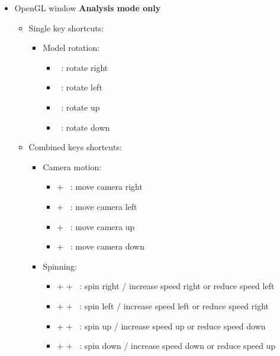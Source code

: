 {\begin{itemize}
\begin{itemize}
\begin{itemize}
\begin{itemize}
\item[] \Ctrl +  : enter / exit fullscreen mode 
\end{itemize}
\item Camero motion: 
\begin{itemize}
\item[] \Shift + \UArrow\ : zoom out
\item[] \Shift + \DArrow\ : zoom in
\end{itemize}
\end{itemize}
\end{itemize}
\item OpenGL window {\bf{Analysis mode only}}
\begin{itemize}
\item Single key shortcuts: 
\begin{itemize}
\item Model rotation: 
\begin{itemize}
\item[] \RArrow\ : rotate right
\item[] \LArrow\ : rotate left
\item[] \UArrow\ : rotate up
\item[] \DArrow\ : rotate down 
\end{itemize}
\end{itemize}
\item Combined keys shortcuts: 
\begin{itemize}
\item Camera motion: 
\begin{itemize}
\item[] \Ctrl + \RArrow\ : move camera right
\item[] \Ctrl + \LArrow\ : move camera left
\item[] \Ctrl + \UArrow\ : move camera up
\item[] \Ctrl + \DArrow\ : move camera down 
\end{itemize}
\item Spinning: 
\begin{itemize}
\item[] \Ctrl + \Shift + \RArrow\ : spin right / increase speed right or reduce speed left
\item[] \Ctrl + \Shift + \RArrow\ : spin left / increase speed left or reduce speed right
\item[] \Ctrl + \Shift + \UArrow\ : spin up / increase speed up or reduce speed down
\item[] \Ctrl + \Shift + \DArrow\ : spin down / increase speed down or reduce speed up 

\end{itemize}
\end{itemize}
\end{itemize}
\end{itemize}}
